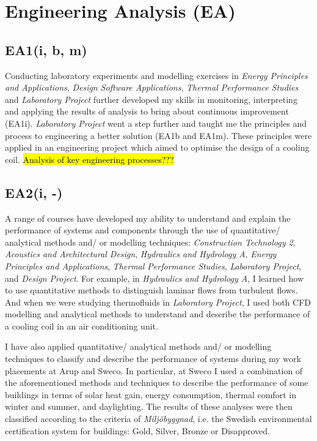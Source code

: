 
\section{Engineering Analysis (EA)} \label{EA}

\subsection*{EA1(i, b, m)}

Conducting laboratory experiments and modelling exercises in \textit{Energy Principles and Applications}, \textit{Design Software Applications}, \textit{Thermal Performance Studies} and \textit{Laboratory Project} further developed my skills in monitoring, interpreting and applying the results of analysis to bring about continuous improvement (EA1i).
\textit{Laboratory Project} went a step further and taught me the principles and process to engineering a better solution (EA1b and EA1m).
These principles were applied in an engineering project which aimed to optimise the design of a cooling coil.
\hl{Analysis of key engineering processes???}





\subsection*{EA2(i, -)}

A range of courses have developed my ability to understand and explain the performance of systems and components through the use of quantitative/ analytical methods and/ or modelling techniques:
\textit{Construction Technology 2},
\textit{Acoustics and Architectural Design},
\textit{Hydraulics and Hydrology A},
\textit{Energy Principles and Applications},
\textit{Thermal Performance Studies},
\textit{Laboratory Project},
and \textit{Design Project}.
For example, in \textit{Hydraulics and Hydrology A}, I learned how to use quantitative methods to distinguish laminar flows from turbulent flows.
And when we were studying thermofluids in \textit{Laboratory Project}, I used both CFD modelling and analytical methods to understand and describe the performance of a cooling coil in an air conditioning unit.

I have also applied quantitative/ analytical methods and/ or modelling techniques to classify and describe the performance of systems during my work placements at Arup and Sweco.
In particular, at Sweco I used a combination of the aforementioned methods and techniques to describe the performance of some buildings in terms of solar heat gain, energy consumption, thermal comfort in winter and summer, and daylighting.
The results of these analyses were then classified according to the criteria of \textit{Miljöbyggnad}, i.e. the Swedish environmental certification system for buildings: Gold, Silver, Bronze or Disapproved.





